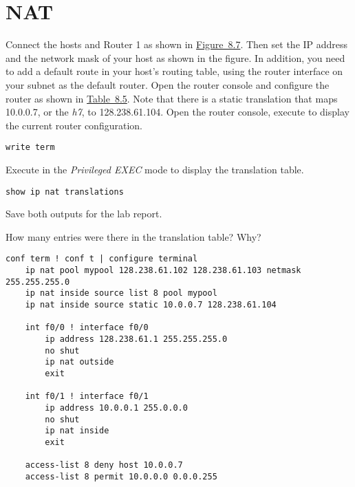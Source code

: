 \documentclass{../UTNetLab}
\begin{document}
\section{NAT}
Connect the hosts and Router 1 as shown in \hyperref[fig:8.7]{Figure~8.7}.
Then set the IP address and the network mask of your host as shown in the figure.
In addition, you need to add a default route in your host’s routing table, using the router interface on your subnet as the default router.
Open the router console and configure the router as shown in \hyperref[tab:8.5]{Table~8.5}.
Note that there is a static translation that maps 10.0.0.7, or the \textit{h7}, to 128.238.61.104.
Open the router console, execute  to display the current router configuration.

\begin{lstlisting}[language={cisco}]
write term
\end{lstlisting}

Execute  in the \textit{Privileged EXEC} mode to display the translation table.

\begin{lstlisting}[language={cisco}]
show ip nat translations
\end{lstlisting}

Save both outputs for the lab report.

\begin{report}
    \item How many entries were there in the translation table? Why?
\end{report}

\begin{minipage}{\linewidth}
\begin{lstlisting}[language={cisco}, emph={mypool}, caption={NAT Router Configuration in \hyperref[fig:8.7]{Figure~8.7} (Table~8.5)\label{tab:8.5}}]
conf term ! conf t | configure terminal
    ip nat pool mypool 128.238.61.102 128.238.61.103 netmask 255.255.255.0
    ip nat inside source list 8 pool mypool
    ip nat inside source static 10.0.0.7 128.238.61.104

    int f0/0 ! interface f0/0
        ip address 128.238.61.1 255.255.255.0
        no shut
        ip nat outside
        exit

    int f0/1 ! interface f0/1
        ip address 10.0.0.1 255.0.0.0
        no shut
        ip nat inside
        exit

    access-list 8 deny host 10.0.0.7
    access-list 8 permit 10.0.0.0 0.0.0.255
    \end{lstlisting}
\end{minipage}
\end{document}
